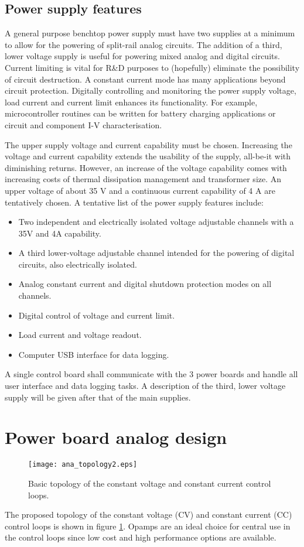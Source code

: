 \documentclass[a4paper,10pt, oneside]{article}
\begin{document}
\subsection*{Power supply features}
A general purpose benchtop power supply must have two supplies at a minimum to allow for the powering of split-rail analog circuits. The addition of a third, lower voltage supply is useful for powering mixed analog and digital circuits. Current limiting is vital for R\&D purposes to (hopefully) eliminate the possibility of circuit destruction. A constant current mode has many applications beyond circuit protection. Digitally controlling and monitoring the power supply voltage, load current and current limit enhances its functionality. For example, microcontroller routines can be written for battery charging applications or circuit and component I-V characterisation. 

The upper supply voltage and current capability must be chosen. Increasing the voltage and current capability extends the usability of the supply, all-be-it with diminishing returns. However, an increase of the voltage capability comes with increasing costs of thermal dissipation management and transformer size. An upper voltage of about 35 V and a continuous current capability of 4 A are tentatively chosen. 
A tentative list of the power supply features include:
\begin{itemize}
	\item Two independent and electrically isolated voltage adjustable channels with a 35V and 4A capability. 
	\item A third lower-voltage adjustable channel intended for the powering of digital circuits, also electrically isolated.
	\item Analog constant current and digital shutdown protection modes on all channels.
	\item Digital control of voltage and current limit.
	\item Load current and voltage readout.
	\item Computer USB interface for data logging.
\end{itemize}
A single control board shall communicate with the 3 power boards and handle all user interface and data logging tasks. A description of the third, lower voltage supply will be given after that of the main supplies. 
\section{Power board analog design}
\begin{figure}[H]
	\texttt{[image: ana\_topology2.eps]}
	\caption{Basic topology of the constant voltage and constant current control loops.}\label{ana_topology}
\end{figure}
The proposed topology of the constant voltage (CV) and constant current (CC) control loops is shown in figure \ref{ana_topology}. Opamps are an ideal choice for central use in the control loops since low cost and high performance options are available.  
\end{document}
